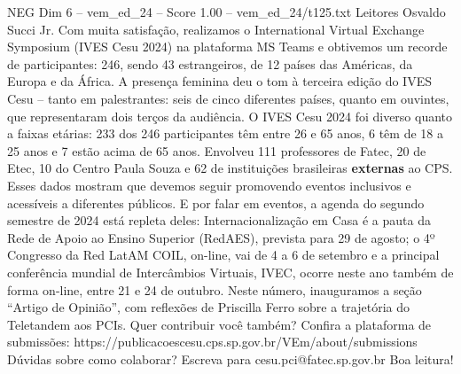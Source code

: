 \begin{textsample}{NEG Dim 6 – vem\_ed\_24 – Score 1.00 – vem\_ed\_24/t125.txt}  \label{ex:f6_neg_103}
Leitores Osvaldo Succi Jr.
Com muita satisfação, realizamos o International Virtual Exchange Symposium (IVES Cesu 2024) na plataforma MS Teams e obtivemos um recorde de participantes: 246, sendo 43 estrangeiros, de 12 países das Américas, da Europa e da África.
A presença feminina deu o tom à terceira edição do IVES Cesu – tanto em palestrantes: seis de cinco diferentes países, quanto em ouvintes, que representaram dois terços da audiência.
O IVES Cesu 2024 foi diverso quanto a faixas etárias: 233 dos 246 participantes têm entre 26 e 65 anos, 6 têm de 18 a 25 anos e 7 estão acima de 65 anos.
Envolveu 111 professores de Fatec, 20 de Etec, 10 do Centro Paula Souza e 62 de instituições brasileiras \textbf{externas} ao CPS.
Esses dados mostram que devemos seguir promovendo eventos inclusivos e acessíveis a diferentes públicos.
E por falar em eventos, a agenda do segundo semestre de 2024 está repleta deles: Internacionalização em Casa é a pauta da Rede de Apoio ao Ensino Superior (RedAES), prevista para 29 de agosto; o 4º Congresso da Red LatAM COIL, on-line, vai de 4 a 6 de setembro e a principal conferência mundial de Intercâmbios Virtuais, IVEC, ocorre neste ano também de forma on-line, entre 21 e 24 de outubro.
Neste número, inauguramos a seção “Artigo de Opinião”, com reflexões de Priscilla Ferro sobre a trajetória do Teletandem aos PCIs.
Quer contribuir você também?
Confira a plataforma de submissões: https://publicacoescesu.cps.sp.gov.br/VEm/about/submissions Dúvidas sobre como colaborar?
Escreva para cesu.pci@fatec.sp.gov.br Boa leitura!

\end{textsample}
